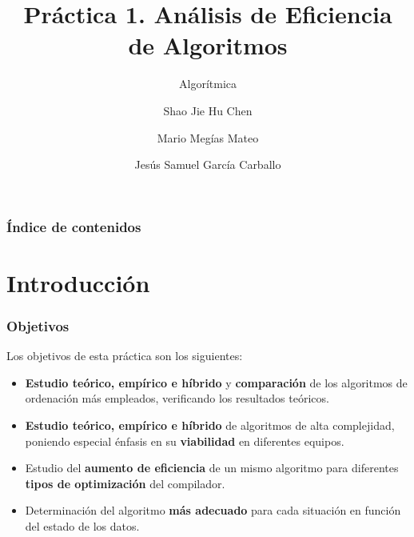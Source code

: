 \documentclass[8pt, aspectratio=169]{beamer}
\author{Shao Jie Hu Chen \and Mario Megías Mateo \and Jesús Samuel García Carballo}
\title{Práctica 1. Análisis de Eficiencia de Algoritmos}
\subtitle{Algorítmica}
\institute{Equipo Rojo}
\begin{document}
	
	\begin{frame}[plain]
		\maketitle
	\end{frame}
	
	\begin{frame}
		\frametitle{Índice de contenidos}
		\tableofcontents
	\end{frame}





	\section{Introducción}

	\begin{frame}
		\frametitle{Objetivos}

            Los objetivos de esta práctica son los siguientes:
            \begin{itemize}
                \item \textbf{Estudio teórico, empírico e híbrido} y \textbf{comparación} de los algoritmos de ordenación más empleados, verificando los resultados teóricos.
                \item \textbf{Estudio teórico, empírico e híbrido} de algoritmos de alta complejidad, poniendo especial énfasis en su \textbf{viabilidad} en diferentes equipos. 
                \item Estudio del \textbf{aumento de eficiencia} de un mismo algoritmo para diferentes \textbf{tipos de optimización} del compilador. 
                \item Determinación del algoritmo \textbf{más adecuado} para cada situación en función del estado de los datos.
            \end{itemize}

	\end{frame}
\end{document}
